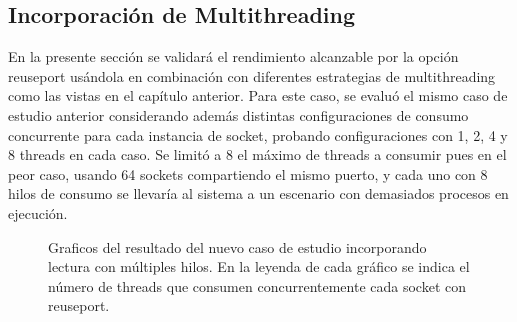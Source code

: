 \subsection{Incorporación de Multithreading}
En la presente sección se validará el rendimiento alcanzable por la opción reuseport usándola en combinación con diferentes estrategias de multithreading como las vistas en el capítulo anterior. Para este caso, se evaluó el mismo caso de estudio anterior considerando además distintas configuraciones de consumo concurrente para cada instancia de socket, probando configuraciones con 1, 2, 4 y 8 threads en cada caso. Se limitó a 8 el máximo de threads a consumir pues en el peor caso, usando 64 sockets compartiendo el mismo puerto, y cada uno con 8 hilos de consumo se llevaría al sistema a un escenario con demasiados procesos en ejecución.

\begin{figure}[h!]
	\centering
	\hspace*{\fill}
	\hfill
	\caption{Graficos del resultado del nuevo caso de estudio incorporando lectura con múltiples hilos. En la leyenda de cada gráfico se indica el número de threads que consumen concurrentemente cada socket con reuseport.}
	\label{fig:resultadosReuseport2}
	\hspace*{\fill}
\end{figure}


